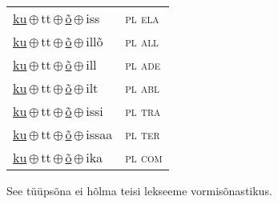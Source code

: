 \begin{minipage}{\textwidth}
\begin{sideways}
\begin{tabular}{l l}
\underline{ku}\,$\oplus$\,tt\,$\oplus$\,\underline{õ}\,$\oplus$\,iss & \textsc{ pl ela } \\
\underline{ku}\,$\oplus$\,tt\,$\oplus$\,\underline{õ}\,$\oplus$\,illõ & \textsc{ pl all } \\
\underline{ku}\,$\oplus$\,tt\,$\oplus$\,\underline{õ}\,$\oplus$\,ill & \textsc{ pl ade } \\
\underline{ku}\,$\oplus$\,tt\,$\oplus$\,\underline{õ}\,$\oplus$\,ilt & \textsc{ pl abl } \\
\underline{ku}\,$\oplus$\,tt\,$\oplus$\,\underline{õ}\,$\oplus$\,issi & \textsc{ pl tra } \\
\underline{ku}\,$\oplus$\,tt\,$\oplus$\,\underline{õ}\,$\oplus$\,issaa & \textsc{ pl ter } \\
\underline{ku}\,$\oplus$\,tt\,$\oplus$\,\underline{õ}\,$\oplus$\,ika & \textsc{ pl com } \\
\end{tabular}
\end{sideways}
\label{tab:tüüpsõnamall-kuõ}

\end{minipage}

 
\vspace{1em}
\noindent See tüüpsõna ei hõlma teisi lekseeme vormi\-sõnastikus.
